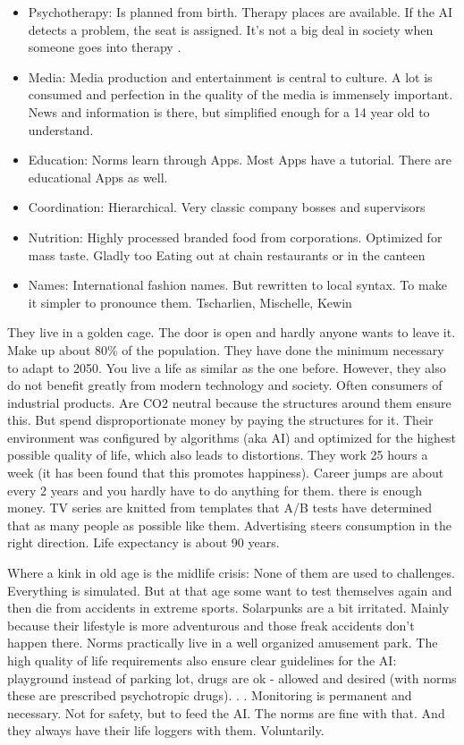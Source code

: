 \begin{itemize}
    \item Psychotherapy: Is planned from birth. Therapy places are available. If the AI detects a problem, the seat is assigned. It's not a big deal in society when someone goes into therapy .
    \item Media: Media production and entertainment is central to culture. A lot is consumed and perfection in the quality of the media is immensely important. News and information is there, but simplified enough for a 14 year old to understand.
    \item Education: Norms learn through Apps. Most Apps have a tutorial. There are educational Apps as well.
    \item Coordination: Hierarchical. Very classic company bosses and supervisors
    \item Nutrition: Highly processed branded food from corporations. Optimized for mass taste. Gladly too Eating out at chain restaurants or in the canteen
    \item Names: International fashion names. But rewritten to local syntax. To make it simpler to pronounce them. Tscharlien, Mischelle, Kewin
\end{itemize}

They live in a golden cage. The door is open and hardly anyone wants to leave it.
Make up about 80\% of the population. They have done the minimum necessary to adapt to 2050. You live  a life as similar as the one before. However, they also do not benefit greatly from modern technology and society. Often consumers of industrial products. Are CO2 neutral because the structures around them ensure this. But spend disproportionate money by paying the structures for it. Their environment was configured by algorithms (aka AI) and optimized for the highest possible quality of life, which also leads to distortions. They work 25 hours a week (it has been found that this promotes happiness). Career jumps are about every 2 years and you hardly have to do anything for them. there is enough money. TV series are knitted from templates that A/B tests have determined that as many people as possible like them. Advertising steers consumption in the right direction. Life expectancy is about 90 years.

Where a kink in old age is the midlife crisis:
None of them are used to challenges. Everything is simulated. But at that age some want to test themselves again and then die from accidents in extreme sports. Solarpunks are a bit irritated. Mainly because their lifestyle is more adventurous and those freak accidents don't happen there.
Norms practically live in a well organized amusement park. The high quality of life requirements also ensure clear guidelines for the AI: playground instead of parking lot, drugs are ok - allowed and desired (with norms these are prescribed psychotropic drugs). . . Monitoring is permanent and
necessary. Not for safety, but to feed the AI. The norms are fine with that. And they always have their life loggers with them. Voluntarily.



